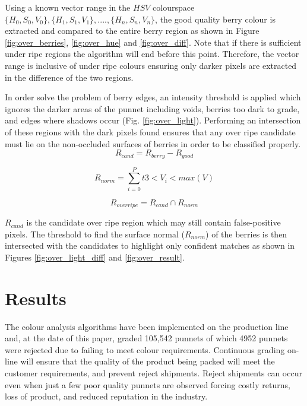 \documentclass[fleqn,twoside,12pt]{report}
\begin{document}
Using a known vector range in the $HSV$ colourspace $\{H_0, S_0, V_0\}, \{H_1, S_1, V_1\},....,\{H_n, S_n, V_n\}$, the good quality berry colour is  extracted and compared to the entire berry region as shown in Figure \ref{fig:over_berries}, \ref{fig:over_hue} and \ref{fig:over_diff}. Note that if there is sufficient under ripe regions the algorithm will end before this point. Therefore, the vector range is inclusive of under ripe colours ensuring only darker pixels are extracted in the difference of the two regions.

In order solve the problem of berry edges, an intensity threshold is applied which ignores the darker areas of the punnet including voids, berries too dark to grade, and edges where shadows occur (Fig. \ref{fig:over_light}). Performing an intersection of these regions with the dark pixels found ensures that any over ripe candidate must lie on the non-occluded surfaces of berries in order to be classified properly. 
\begin{equation}
R_{cand} = R_{berry} - R_{good}
\label{diff_berry_hue}
\end{equation}

\begin{equation}
R_{norm} = \sum_{i=0}^{P}t3<V_i<max(V)
\label{berry_tops}
\end{equation}

\begin{equation}
R_{over ripe} = R_{cand} \cap R_{norm}
\label{intersect_dark_berry}
\end{equation}

$R_{cand}$ is the candidate over ripe region which may still contain false-positive pixels. The threshold to find the surface normal ($R_{norm}$) of the berries is then intersected with the candidates to highlight only confident matches as shown in Figures \ref{fig:over_light_diff} and \ref{fig:over_result}.


\section{Results}


The colour analysis algorithms have been implemented on the production line and, at the date of this paper, graded 105,542 punnets of which 4952 punnets were rejected due to failing to meet colour requirements. Continuous grading on-line will ensure that the quality of the product being packed will meet the customer requirements, and prevent reject shipments. Reject shipments can occur even when just a few poor quality punnets are observed forcing costly returns, loss of product, and reduced reputation in the industry.
\end{document}
